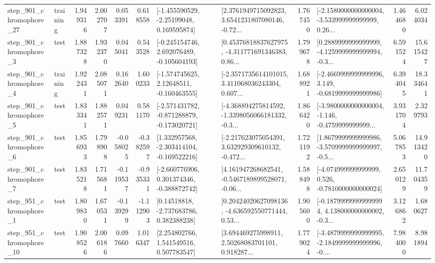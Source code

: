 \begin{tabular}{llrrrrllrlrr}
  step\_901\_chromophore\_27 &  training &      1.949316 &    2.002707 &      0.053391 &  0.618558 &    [-1.455590529, -2.25199048, 0.169595874] &  [2.3761949715092823, 3.6541231807080146, -0.72... &       1.767450 &  [-2.1580000000000004, -3.533999999999999, 0.26... &            1.464680 &          6.024034 \\
   step\_901\_chromophore\_3 &      test &      1.887328 &    1.932370 &      0.045041 &  0.543528 &   [-0.245154746, 2.692076489, -0.105604193] &  [0.45376818837627975, -4.311771691346383, 0.86... &       1.799678 &  [0.2889999999999999, -4.1259999999999994, -0.3... &            6.591524 &         15.615427 \\
   step\_901\_chromophore\_4 &  training &      1.922431 &    2.085071 &      0.162640 &  1.600233 &    [-1.574745625, 2.12648511, -0.160463555] &  [-2.3571735614101015, 3.411068036243304, 0.607... &       1.688921 &  [-2.4669999999999996, 3.149, -0.6819999999999986] &            6.394045 &         18.334641 \\
   step\_901\_chromophore\_5 &      test &      1.833341 &    1.882571 &      0.049231 &  0.581170 &  [-2.571431782, -0.871288879, -0.173020721] &  [-4.368894275814592, -1.3398056066181332, -0.3... &       1.866420 &  [-3.9800000000000004, -1.146, -0.4759999999999... &            3.931704 &          2.329793 \\
   step\_901\_chromophore\_6 &      test &      1.856933 &    1.798908 &     -0.058025 & -0.382597 &   [1.332957568, -2.303414104, -0.169522216] &  [-2.217623075054391, 3.632929309610132, -0.472... &       1.721192 &  [1.8679999999999986, -3.5709999999999997, -0.5... &            5.067853 &         14.913420 \\
   step\_901\_chromophore\_7 &      test &      1.835218 &    1.715681 &     -0.119537 & -0.935331 &   [-2.660776906, 0.301374346, -0.388872742] &  [4.161947268682541, -0.5467189899528071, -0.06... &       1.588498 &   [-4.074999999999999, 0.526, -0.7810000000000024] &            2.650129 &         11.704359 \\
   step\_951\_chromophore\_1 &      test &      1.809830 &    1.670531 &     -0.139299 & -1.112903 &     [0.14518818, -2.737683786, 0.382388238] &  [0.20424020627098136, -4.636592550771444, 0.53... &       1.905600 &  [-0.18799999999999994, 4.138000000000002, -0.3... &            3.126862 &          1.680627 \\
  step\_951\_chromophore\_10 &      test &      1.908526 &    2.006186 &      0.097660 &  1.016347 &     [2.254802766, 1.541549516, 0.507783547] &  [3.694469275998911, 2.50268083701101, 0.918287... &       1.779024 &  [-3.4879999999999995, -2.1849999999999996, -0.... &            7.984000 &          8.981894 \\

\end{tabular}
